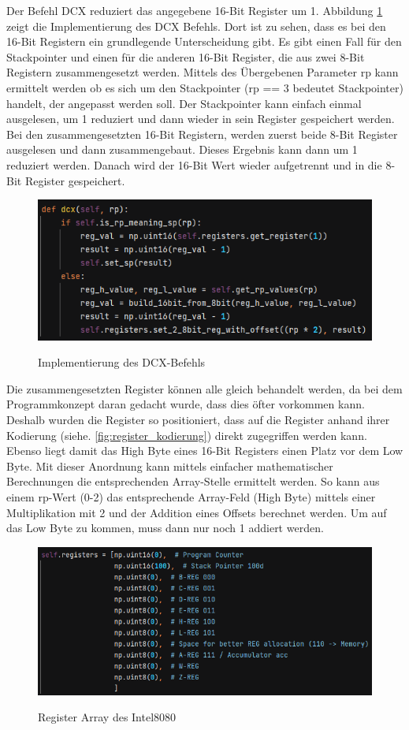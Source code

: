 \documentclass[12pt]{article}
\newcommand{\imgSpaceBefore}{\\[0.2cm]}
\begin{document}
\noindent
Der Befehl DCX reduziert das angegebene 16-Bit Register um 1. 
Abbildung \ref{fig:dcx_impl} zeigt die Implementierung des DCX Befehls. 
Dort ist zu sehen, dass es bei den 16-Bit Registern ein grundlegende Unterscheidung gibt. Es gibt einen Fall für den Stackpointer und einen für die anderen 16-Bit Register, die aus zwei 8-Bit Registern zusammengesetzt werden. Mittels des Übergebenen Parameter rp kann ermittelt werden ob es sich um den Stackpointer (rp  == 3 bedeutet Stackpointer) handelt, der angepasst werden soll. 
Der Stackpointer kann einfach einmal ausgelesen, um 1 reduziert und dann wieder in sein Register gespeichert werden.
Bei den zusammengesetzten 16-Bit Registern, werden zuerst beide 8-Bit Register ausgelesen und dann zusammengebaut. Dieses Ergebnis kann dann um 1 reduziert werden. Danach wird der 16-Bit Wert wieder aufgetrennt und in die 8-Bit Register gespeichert. 
\imgSpaceBefore
\begin{figure}[H]
\caption{Implementierung des DCX-Befehls}
\centering
\includegraphics[width=15cm]{Bilder/dcx_impl}
\label{fig:dcx_impl}
\end{figure}

\noindent
Die zusammengesetzten Register können alle gleich behandelt werden, da bei dem Programmkonzept daran gedacht wurde, dass dies öfter vorkommen kann. Deshalb wurden die Register so positioniert, dass auf die Register anhand ihrer Kodierung (siehe. \ref{fig:register_kodierung}) direkt zugegriffen werden kann. Ebenso liegt damit das High Byte eines 16-Bit Registers einen Platz vor dem Low Byte. Mit dieser Anordnung kann mittels einfacher mathematischer Berechnungen die entsprechenden Array-Stelle ermittelt werden. So kann aus einem rp-Wert (0-2) das entsprechende Array-Feld (High Byte) mittels einer Multiplikation mit 2 und der Addition eines Offsets berechnet werden. Um auf das Low Byte zu kommen, muss dann nur noch 1 addiert werden.
\imgSpaceBefore
\begin{figure}[H]
\caption{Register Array des Intel8080}
\centering
\includegraphics[width=15cm]{Bilder/register_array}
\label{fig:reg_array}
\end{figure}
\end{document}
